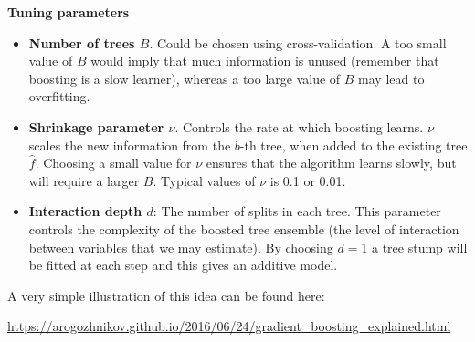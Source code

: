 \documentclass[
  10pt,
  ignorenonframetext,
]{beamer}
\begin{document}
\begin{frame}
\textbf{Tuning parameters}

\begin{itemize}
\item
  \textbf{Number of trees \(B\)}. Could be chosen using
  cross-validation. A too small value of \(B\) would imply that much
  information is unused (remember that boosting is a slow learner),
  whereas a too large value of \(B\) may lead to overfitting.
\item
  \textbf{Shrinkage parameter \(\nu\)}. Controls the rate at which
  boosting learns. \(\nu\) scales the new information from the \(b\)-th
  tree, when added to the existing tree \(\hat{f}\). Choosing a small
  value for \(\nu\) ensures that the algorithm learns slowly, but will
  require a larger \(B\). Typical values of \(\nu\) is 0.1 or 0.01.
\item
  \textbf{Interaction depth \(d\)}: The number of splits in each tree.
  This parameter controls the complexity of the boosted tree ensemble
  (the level of interaction between variables that we may estimate). By
  choosing \(d=1\) a tree stump will be fitted at each step and this
  gives an additive model.
\end{itemize}
\end{frame}

\begin{frame}
A very simple illustration of this idea can be found here:

\url{https://arogozhnikov.github.io/2016/06/24/gradient_boosting_explained.html}
\end{frame}
\end{document}
